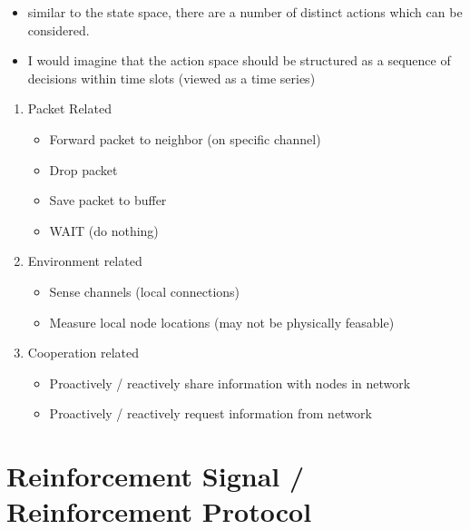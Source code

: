 \documentclass[11pt]{article}
\providecommand{\tightlist}{%
      \setlength{\itemsep}{0pt}\setlength{\parskip}{0pt}}
\begin{document}
\begin{itemize}
\tightlist
\item
  similar to the state space, there are a number of distinct actions
  which can be considered.
\item
  I would imagine that the action space should be structured as a
  sequence of decisions within time slots (viewed as a time series)
\end{itemize}

\begin{enumerate}
\def\labelenumi{\arabic{enumi}.}
\item
  Packet Related

  \begin{itemize}
  \tightlist
  \item
    Forward packet to neighbor (on specific channel)
  \item
    Drop packet
  \item
    Save packet to buffer
  \item
    WAIT (do nothing)
  \end{itemize}
\item
  Environment related

  \begin{itemize}
  \tightlist
  \item
    Sense channels (local connections)
  \item
    Measure local node locations (may not be physically feasable)
  \end{itemize}
\item
  Cooperation related

  \begin{itemize}
  \tightlist
  \item
    Proactively / reactively share information with nodes in network
  \item
    Proactively / reactively request information from network
  \end{itemize}
\end{enumerate}

    \hypertarget{reinforcement-signal-reinforcement-protocol}{%
\section{Reinforcement Signal / Reinforcement
Protocol}\label{reinforcement-signal-reinforcement-protocol}}
\end{document}
